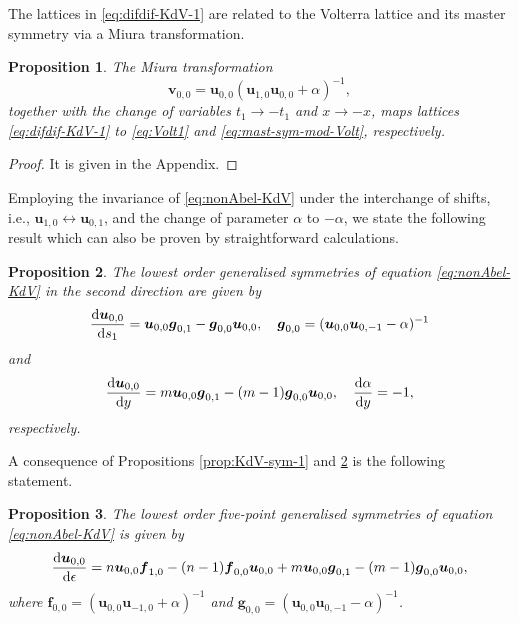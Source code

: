 \documentclass[dvips,10pt]{article}
\newcommand{\bs}{\boldsymbol}
\newcommand{\bsu}{ {\bs{u}}}
\newtheorem{proposition}{Proposition}
\theoremstyle{remark} %
\begin{document}
	The lattices in \eqref{eq:difdif-KdV-1} are related to the Volterra lattice and its master symmetry via a Miura transformation. 
	
	\begin{proposition} \label{prop:Miura-KdV}
		The Miura transformation 	
		\begin{equation} \label{eq:Miura}
			{\bs{v}}_{0,0} = {\bs{u}}_{0,0} ({\bs{u}}_{1,0} {\bs{u}}_{0,0}+\alpha)^{-1},
		\end{equation}
		together with the change of variables $t_1 \rightarrow -t_1$ and $x \rightarrow -x$, maps lattices \eqref{eq:difdif-KdV-1} to \eqref{eq:Volt1} and \eqref{eq:mast-sym-mod-Volt}, respectively.
	\end{proposition}
	
	\begin{proof}
		It is given in the Appendix.
	\end{proof}
	
	Employing the invariance of \eqref{eq:nonAbel-KdV} under the interchange of shifts, i.e., $\bsu_{1,0} \leftrightarrow \bsu_{0,1}$, and the change of parameter $\alpha$ to $-\alpha$, we state the following result which can also be proven by straightforward calculations.
	\begin{proposition}  \label{prop:KdV-sym-2}
		The lowest order generalised symmetries of equation \eqref{eq:nonAbel-KdV} in the second direction are given by 
		\begin{equation} \label{eq:sym1a-KdV}
			\frac{{\rm{d}} {\bs{u}}_{0,0}}{{\rm{d}} s_1} =  {\bs{u}}_{0,0} {\bs{g}}_{0,1} -{\bs{g}}_{0,0}  {\bs{u}}_{0,0}, ~~~ {\bs{g}}_{0,0} = ({\bs{u}}_{0,0} {\bs{u}}_{0,-1}-\alpha)^{-1}
		\end{equation}
		and
		\begin{equation} \label{eq:mast-sym-2-KdV}
			\frac{{\rm{d}} {\bs{u}}_{0,0}}{{\rm{d}} y} =  m {\bs{u}}_{0,0} {\bs{g}}_{0,1} -(m-1) {\bs{g}}_{0,0}  {\bs{u}}_{0,0},~~~ \frac{{\rm{d}} \alpha}{{\rm{d}} y} = -1,
		\end{equation}
		respectively. 
	\end{proposition}
	
	A consequence of Propositions \ref{prop:KdV-sym-1} and \ref{prop:KdV-sym-2} is the following statement.
	\begin{proposition}
		The lowest order five-point generalised symmetries of equation \eqref{eq:nonAbel-KdV} is given by 
		\begin{equation} \label{eq:mast-sym-12-KdV}
			\frac{{\rm{d}} {\bs{u}}_{0,0}}{{\rm{d}} \epsilon} =   n {\bs{u}}_{0,0} {\bs{f}}_{1,0} -(n-1) {\bs{f}}_{0,0}  {\bs{u}}_{0,0}+  m {\bs{u}}_{0,0} {\bs{g}}_{0,1} -(m-1) {\bs{g}}_{0,0}  {\bs{u}}_{0,0},
		\end{equation}
		where ${\bs{f}}_{0,0} = ( {\bs{u}}_{0,0} {\bs{u}}_{-1,0}+\alpha)^{-1} $ and  ${\bs{g}}_{0,0} = ({\bs{u}}_{0,0} {\bs{u}}_{0,-1}-\alpha)^{-1} $.
	\end{proposition}
	
\end{document}
